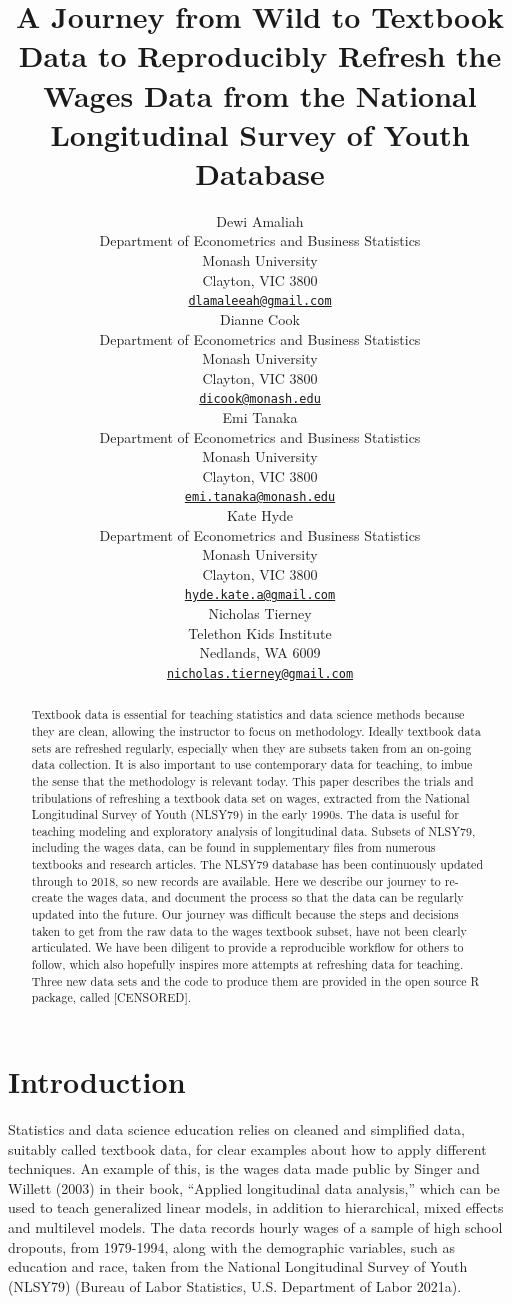 \documentclass{article}
\title{A Journey from Wild to Textbook Data to Reproducibly Refresh the Wages Data from the National Longitudinal Survey of Youth Database}
\author{
    Dewi Amaliah
   \\
    Department of Econometrics and Business Statistics \\
    Monash University \\
  Clayton, VIC 3800 \\
  \texttt{\href{mailto:dlamaleeah@gmail.com}{\nolinkurl{dlamaleeah@gmail.com}}} \\
   \And
    Dianne Cook
   \\
    Department of Econometrics and Business Statistics \\
    Monash University \\
  Clayton, VIC 3800 \\
  \texttt{\href{mailto:dicook@monash.edu}{\nolinkurl{dicook@monash.edu}}} \\
   \And
    Emi Tanaka
   \\
    Department of Econometrics and Business Statistics \\
    Monash University \\
  Clayton, VIC 3800 \\
  \texttt{\href{mailto:emi.tanaka@monash.edu}{\nolinkurl{emi.tanaka@monash.edu}}} \\
   \And
    Kate Hyde
   \\
    Department of Econometrics and Business Statistics \\
    Monash University \\
  Clayton, VIC 3800 \\
  \texttt{\href{mailto:hyde.kate.a@gmail.com}{\nolinkurl{hyde.kate.a@gmail.com}}} \\
   \And
    Nicholas Tierney
   \\
    Telethon Kids Institute \\
  Nedlands, WA 6009 \\
  \texttt{\href{mailto:nicholas.tierney@gmail.com}{\nolinkurl{nicholas.tierney@gmail.com}}} \\
  }
\begin{document}
\maketitle


\begin{abstract}
Textbook data is essential for teaching statistics and data science methods because they are clean, allowing the instructor to focus on methodology. Ideally textbook data sets are refreshed regularly, especially when they are subsets taken from an on-going data collection. It is also important to use contemporary data for teaching, to imbue the sense that the methodology is relevant today. This paper describes the trials and tribulations of refreshing a textbook data set on wages, extracted from the National Longitudinal Survey of Youth (NLSY79) in the early 1990s. The data is useful for teaching modeling and exploratory analysis of longitudinal data. Subsets of NLSY79, including the wages data, can be found in supplementary files from numerous textbooks and research articles. The NLSY79 database has been continuously updated through to 2018, so new records are available. Here we describe our journey to re-create the wages data, and document the process so that the data can be regularly updated into the future. Our journey was difficult because the steps and decisions taken to get from the raw data to the wages textbook subset, have not been clearly articulated. We have been diligent to provide a reproducible workflow for others to follow, which also hopefully inspires more attempts at refreshing data for teaching. Three new data sets and the code to produce them are provided in the open source R package, called {[}CENSORED{]}.
\end{abstract}


\hypertarget{intro}{%
\section{Introduction}\label{intro}}

Statistics and data science education relies on cleaned and simplified data, suitably called textbook data, for clear examples about how to apply different techniques. An example of this, is the wages data made public by Singer and Willett (2003) in their book, ``Applied longitudinal data analysis,'' which can be used to teach generalized linear models, in addition to hierarchical, mixed effects and multilevel models. The data records hourly wages of a sample of high school dropouts, from 1979-1994, along with the demographic variables, such as education and race, taken from the National Longitudinal Survey of Youth (NLSY79) (Bureau of Labor Statistics, U.S. Department of Labor 2021a).
\end{document}
